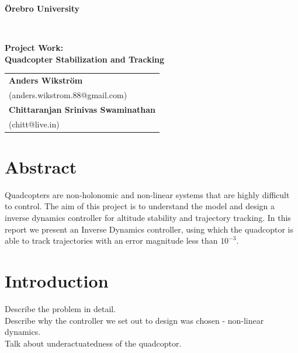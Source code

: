 \documentclass[12pt,fleqn]{article}
\begin{document}
\thispagestyle{empty}
\noindent\makebox[\linewidth]{\rule{.75\paperwidth}{0.4pt}}
\begin{center}
{\Large \textbf{{\"O}rebro University}}
\end{center}
\vspace{-4mm}
\noindent\makebox[\linewidth]{\rule{.75\paperwidth}{0.4pt}} \\
\vspace{4cm}
\begin{center}
{\Large\sffamily\bfseries
Project Work: \\[1ex]
Quadcopter Stabilization and Tracking \\[2ex]
}

\vspace{6cm}
\noindent\makebox[\linewidth]{\rule{.75\paperwidth}{0.4pt}}
{\large
\renewcommand{\arraystretch}{1.5}
  \begin{tabular}{l}
   \textbf{Anders Wikstr\"{o}m}\\
   (anders.wikstrom.88@gmail.com)\\
   \textbf{Chittaranjan Srinivas Swaminathan}\\
   (chitt@live.in)\\
 \end{tabular}}
\end{center}
\vspace{-2mm}
\noindent\makebox[\linewidth]{\rule{.75\paperwidth}{0.4pt}}
\newpage

\tableofcontents

\newpage



\section*{Abstract}
Quadcopters are non-holonomic and non-linear systems that are highly
difficult to control. The aim of this project is to understand the
model and design a inverse dynamics controller for altitude stability
and trajectory tracking. In this report we present an Inverse Dynamics
controller, using which the quadcoptor is able to track trajectories
with an error magnitude less than $10^{-3}$. 

\section{Introduction}

Describe the problem in detail.\\
Describe why the controller we set out to design was chosen -
non-linear dynamics.\\
Talk about underactuatedness of the quadcoptor.\\
\end{document}
